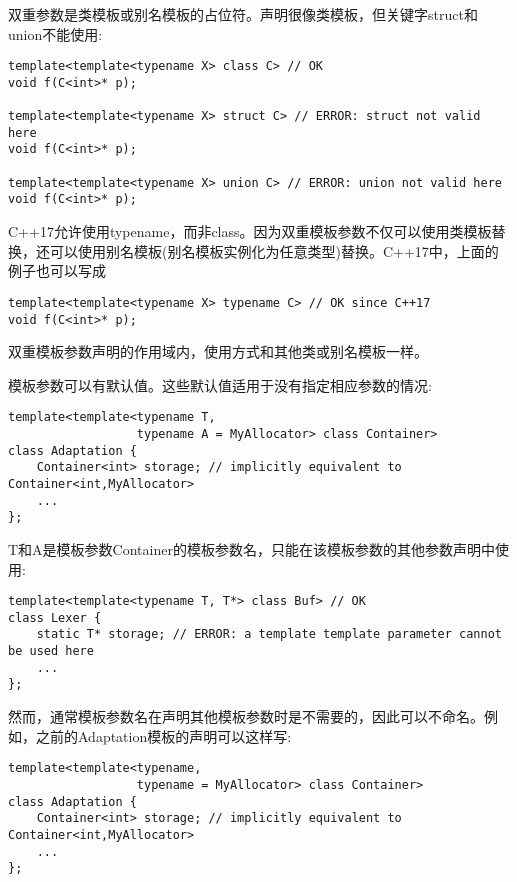 双重参数是类模板或别名模板的占位符。声明很像类模板，但关键字struct和union不能使用:

\begin{lstlisting}[style=styleCXX]
template<template<typename X> class C> // OK
void f(C<int>* p);

template<template<typename X> struct C> // ERROR: struct not valid here
void f(C<int>* p);

template<template<typename X> union C> // ERROR: union not valid here
void f(C<int>* p);
\end{lstlisting}

C++17允许使用typename，而非class。因为双重模板参数不仅可以使用类模板替换，还可以使用别名模板(别名模板实例化为任意类型)替换。C++17中，上面的例子也可以写成

\begin{lstlisting}[style=styleCXX]
template<template<typename X> typename C> // OK since C++17
void f(C<int>* p);
\end{lstlisting}

双重模板参数声明的作用域内，使用方式和其他类或别名模板一样。

模板参数可以有默认值。这些默认值适用于没有指定相应参数的情况:

\begin{lstlisting}[style=styleCXX]
template<template<typename T,
				  typename A = MyAllocator> class Container>
class Adaptation {
	Container<int> storage; // implicitly equivalent to Container<int,MyAllocator>
	...
};
\end{lstlisting}

T和A是模板参数Container的模板参数名，只能在该模板参数的其他参数声明中使用:

\begin{lstlisting}[style=styleCXX]
template<template<typename T, T*> class Buf> // OK
class Lexer {
	static T* storage; // ERROR: a template template parameter cannot be used here
	...
};
\end{lstlisting}

然而，通常模板参数名在声明其他模板参数时是不需要的，因此可以不命名。例如，之前的Adaptation模板的声明可以这样写:

\begin{lstlisting}[style=styleCXX]
template<template<typename,
				  typename = MyAllocator> class Container>
class Adaptation {
	Container<int> storage; // implicitly equivalent to Container<int,MyAllocator>
	...
};
\end{lstlisting}


